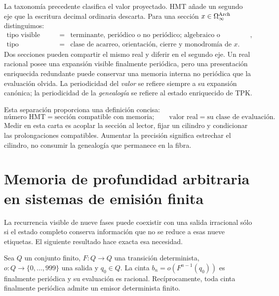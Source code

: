 La taxonomía precedente clasifica el valor proyectado. HMT añade un segundo
eje que la escritura decimal ordinaria descarta. Para una sección
\(x\in\Omega_\infty^{\rm Arch}\) distinguimos:
\[
 \begin{array}{rcl}
 \text{tipo visible}&=&
 \text{terminante, periódico o no periódico; algebraico o trascendente},\\
 \text{tipo genealógico}&=&
 \text{clase de acarreo, orientación, cierre y monodromía de }x.
 \end{array}
\]
Dos secciones pueden compartir el mismo real y diferir en el segundo eje. Un
real racional posee una expansión visible finalmente periódica, pero una
presentación enriquecida redundante puede conservar una memoria interna no
periódica que la evaluación olvida. La periodicidad del \emph{valor} se
refiere siempre a su expansión canónica; la periodicidad de la
\emph{genealogía} se refiere al estado enriquecido de TPK.

Esta separación proporciona una definición concisa:
\begin{equation}
 \boxed{
 \text{número HMT}
 =
 \text{sección compatible con memoria};
 \qquad
 \text{valor real}
 =
 \text{su clase de evaluación}.}
 \label{eq:numero-hmt-y-valor-real}
\end{equation}
Medir en esta carta es acoplar la sección al lector, fijar un cilindro y
condicionar las prolongaciones compatibles. Aumentar la precisión significa
estrechar el cilindro, no consumir la genealogía que permanece en la fibra.

\section{Memoria de profundidad arbitraria en sistemas de emisión finita}

La recurrencia visible de nueve fases puede coexistir con una salida
irracional sólo si el estado completo conserva información que no se reduce a
esas nueve etiquetas. El siguiente resultado hace exacta esa necesidad.

\begin{theorem}
\label{thm:emisor-finito-racional}
Sea \(Q\) un conjunto finito, \(F:Q\to Q\) una transición determinista,
\(o:Q\to\{0,\ldots,999\}\) una salida y \(q_0\in Q\). La cinta
\(b_n=o(F^{n-1}(q_0))\) es finalmente periódica y su evaluación es racional.
Recíprocamente, toda cinta finalmente periódica admite un emisor determinista
finito.
\end{theorem}

